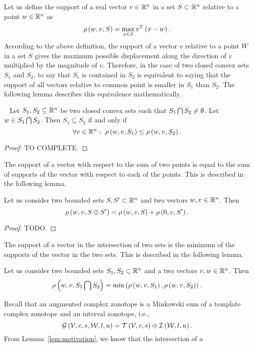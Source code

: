 Let us define the support of a real vector $v\in\mathbb{R}^n$ in a set
$S\subset\mathbb{R}^n$ relative to a point $w\in\mathbb{R}^n$ as
%
\[
\rho\left(w,v,S\right)=\max_{x\in S}v^T\left(x-w\right).
\]
%
According to the above definition, the support of a vector $v$
relative to a point $W$ in a set $S$ gives the maximum possible
displacement along the direction of $v$ multiplied by the magnitude of
$v$.  Therefore, in the case of two closed convex sets $S_1$ and
$S_2$, to say that $S_1$ is contained in $S_2$ is equivalent to saying
that the support of all vectors relative to common point is smaller in
$S_1$ than $S_2$.  The following lemma describes this equivalence
mathematically.
%
\begin{lemma}~\label{supp-inclusion}
Let $S_1,S_2\subseteq \mathbb{R}^n$ be two closed convex sets such that
$S_1\bigcap S_2\neq \emptyset$.  Let $w\in S_1\bigcap S_2$.
Then $S_1\subseteq S_2$ if and only if
%
\[
\forall
v\in\mathbb{R}^n:~\rho\left(w,v,S_1\right)\leq \rho\left(w,v,S_2\right).
\]
%
\end{lemma}
%
\begin{proof}
{\color{red} TO COMPLETE}.
\end{proof}
%
The support of a vector with respect to the sum of two points is
equal to the sum of supports of the vector with respect to each of the
points.  This is described in the following lemma.
%
\begin{lemma}
Let us consider two bounded sets $S,S^\prime\subset\mathbb{R}^n$ and two
vectors $w,v\in\mathbb{R}^n$.  Then
%
\[
\rho\left(w,v,S\oplus S^\prime\right)=\rho\left(w,v,S\right)+\rho\left(0,v,S^\prime\right).
\]
%
\end{lemma}
%
\begin{proof}
  {\color{red} TODO}.
\end{proof}
%
The support of a vector in the intersection of two sets is the minimum
of the supports of the vector in the two sets.  This is described in
the following lemma.
%
\begin{lemma}
Let us consider two bounded sets $S_1,S_2\subset\mathbb{R}^n$ and a two
vectors $v,w\in\mathbb{R}^n$.  Then
%
\[
\rho\left(w,v,S_1\bigcap S_2\right)=\min\left(\rho\left(w,v,S_1\right),\rho\left(w,v,S_2\right)\right).
\]
%
\end{lemma}
%
Recall that an augmented complex zonotope is a Minkowski sum of a
template complex zonotope and an interval zonotope, i.e.,
%
\[
\mathcal{G}\left(\mathcal{V},c,s,\mathcal{W},l,u\right)=\mathit{\operatorname{\mathcal{T}}}\left(\mathcal{V},c,s\right)\oplus \mathit{\operatorname{\mathcal{I}}}\left(\mathcal{W},l,u\right).
\]
%
From
Lemma~\ref{lem:motivation}, we know that the intersection of a
